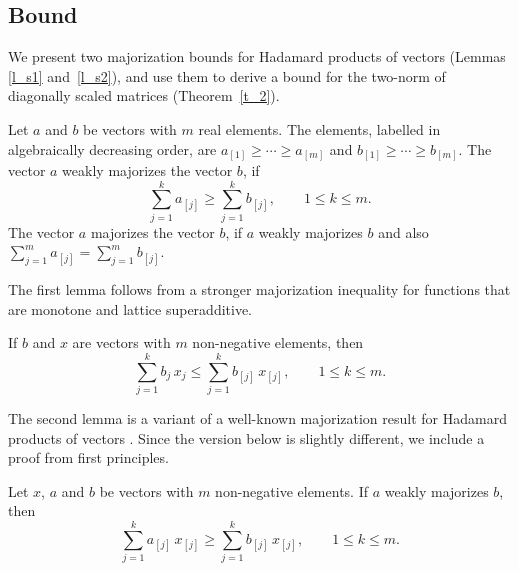 \documentclass{siamltex}
\begin{document}
\subsection{Bound}\label{s_tns}
We present two majorization bounds for Hadamard products of vectors
(Lemmas \ref{l_s1} and~\ref{l_s2}), and use them to 
derive a bound for the two-norm of diagonally scaled matrices
(Theorem~\ref{t_2}). 

\begin{definition}\label{d_maj}
Let $a$ and $b$ be vectors with $m$ real elements. The 
elements, labelled in algebraically decreasing order, are 
$a_{[1]}\geq \cdots\geq a_{[m]}$ and 
$b_{[1]}\geq \cdots\geq b_{[m]}$. 
The vector $a$ {\rm weakly majorizes} the vector $b$, if 
$$\sum_{j=1}^k{a_{[j]}}\geq \sum_{j=1}^k{b_{[j]}}, \qquad 1\leq k\leq m.$$
The vector $a$ {\rm majorizes} the vector $b$, if 
$a$ weakly majorizes $b$ and also $\sum_{j=1}^m{a_{[j]}}=\sum_{j=1}^m{b_{[j]}}$.
\end{definition}

The first lemma follows from a stronger majorization inequality for 
functions that are monotone and lattice superadditive.

\begin{lemma}\label{l_s2}
If $b$ and $x$ are vectors with $m$ non-negative elements, then
$$\sum_{j=1}^k{b_j\, x_j}\leq \sum_{j=1}^k{b_{[j]}\, x_{[j]}},
\qquad 1\leq k\leq m.$$
\end{lemma}

The second lemma is a variant of a well-known majorization result for 
Hadamard products of vectors \cite[Lemma 4.3.51]{HoJ12}. Since the
version below is slightly different, we include a proof from first principles.

\begin{lemma}\label{l_s1}
Let $x$, $a$ and $b$ be vectors with $m$ non-negative elements.
If $a$ weakly majorizes $b$, then
$$\sum_{j=1}^k{a_{[j]}\, x_{[j]}}\geq \sum_{j=1}^k{b_{[j]}\, x_{[j]}},
\qquad 1\leq k\leq m.$$
\end{lemma}
\end{document}
